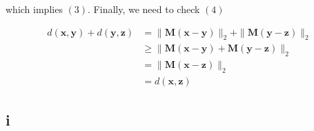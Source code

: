 \documentclass[11pt,a4paper]{article}
\begin{document}
which implies $(3)$. Finally, we need to check $(4)$

\begin{align*}
d(\bm{x}, \bm{y}) + 
d(\bm{y}, \bm{z}) &= \| \bm{M}(\bm{x} - \bm{y}) \|_{2} + \| \bm{M}(\bm{y} - \bm{z}) \|_{2} \\
                  &\geq \| \bm{M}(\bm{x} - \bm{y}) +  \bm{M}(\bm{y} - \bm{z}) \|_{2} \\
                  &= \| \bm{M}(\bm{x} - \bm{z}) \|_{2} \\
                  &= d(\bm{x},\bm{z})
\end{align*}

\subsection{i}
\end{document}
